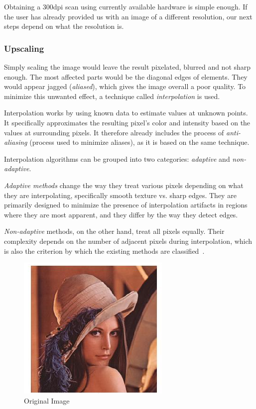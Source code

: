 Obtaining a 300dpi scan using currently available hardware is simple enough. If the user has already provided us with an image of a different resolution, our next steps depend on what the resolution is.

\subsubsection{Upscaling}

Simply scaling the image would leave the result pixelated, blurred and not sharp enough. The most affected parts would be the diagonal edges of elements. They would appear jagged (\emph{aliased}), which gives the image overall a poor quality. To minimize this unwanted effect, a technique called \emph{interpolation} is used.

Interpolation works by using known data to estimate values at unknown points. It specifically approximates the resulting pixel's color and intensity based on the values at surrounding pixels. It therefore already includes the process of \emph{anti-aliasing} (process used to minimize aliases), as it is based on the same technique.

Interpolation algorithms can be grouped into two categories: \emph{adaptive} and \emph{non-adaptive}.

\emph{Adaptive methods} change the way they treat various pixels depending on what they are interpolating, specifically smooth texture vs. sharp edges. They are primarily designed to minimize the presence of interpolation artifacts in regions where they are most apparent, and they differ by the way they detect edges.

\emph{Non-adaptive} methods, on the other hand, treat all pixels equally. Their complexity depends on the number of adjacent pixels during interpolation, which is also the criterion by which the existing methods are classified~\cite{interpolation}.

\begin{figure}[H]
\centering
\includegraphics[width=0.3\linewidth]{img/preprocessing/interp_orig.pdf}
\caption{Original Image} \label{fig:1a}
\end{figure}

